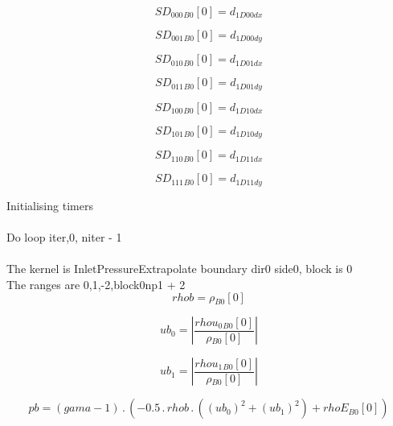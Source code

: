 \documentclass{article}
\begin{document}
\begin{dmath}{SD_{000}{_{B0}}}[{0}] = d_{1 D00 dx}\end{dmath}

\begin{dmath}{SD_{001}{_{B0}}}[{0}] = d_{1 D00 dy}\end{dmath}

\begin{dmath}{SD_{010}{_{B0}}}[{0}] = d_{1 D01 dx}\end{dmath}

\begin{dmath}{SD_{011}{_{B0}}}[{0}] = d_{1 D01 dy}\end{dmath}

\begin{dmath}{SD_{100}{_{B0}}}[{0}] = d_{1 D10 dx}\end{dmath}

\begin{dmath}{SD_{101}{_{B0}}}[{0}] = d_{1 D10 dy}\end{dmath}

\begin{dmath}{SD_{110}{_{B0}}}[{0}] = d_{1 D11 dx}\end{dmath}

\begin{dmath}{SD_{111}{_{B0}}}[{0}] = d_{1 D11 dy}\end{dmath}

\noindent Initialising timers\\
\\\noindent Do loop iter,0, niter - 1\\
\\\noindent The kernel is InletPressureExtrapolate boundary dir0 side0, block is 0\\\noindent The ranges are 0,1,-2,block0np1 + 2\\\begin{dmath}rhob = {\rho{_{B0}}}[{0}]\end{dmath}

\begin{dmath}ub_{0} = \left|{\frac{{rhou_{0}{_{B0}}}[{0}]}{{\rho{_{B0}}}[{0}]}}\right|\end{dmath}

\begin{dmath}ub_{1} = \left|{\frac{{rhou_{1}{_{B0}}}[{0}]}{{\rho{_{B0}}}[{0}]}}\right|\end{dmath}

\begin{dmath}pb = \left(gama - 1\right) \,.\, \left(- 0.5 \,.\, rhob \,.\, \left(\left(ub_{0} \right)^{2} + \left(ub_{1} \right)^{2}\right) + {rhoE{_{B0}}}[{0}]\right)\end{dmath}
\end{document}
